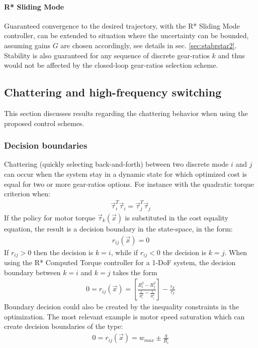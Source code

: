 \paragraph{R* Sliding Mode} Guaranteed convergence to the desired trajectory, with the R* Sliding Mode controller, can be extended to situation where the uncertainty can be bounded, assuming gains $G$ are chosen accordingly, see details in sec. \ref{sec:stabrstar2}. Stability is also guaranteed for any sequence of discrete gear-ratios $k$ and thus would not be affected by the closed-loop gear-ratios selection scheme.


\subsection{Chattering and high-frequency switching}

This section discusses results regarding the chattering behavior when using the proposed control schemes. 

\subsubsection{Decision boundaries}

Chattering (quickly selecting back-and-forth) between two discrete mode $i$ and $j$ can occur when the system stay in a dynamic state for which optimized cost is equal for two or more gear-ratios options. For instance with the quadratic torque criterion when:
%
\begin{align}
\vec{\tau}_i^T \vec{\tau}_i = \vec{\tau}_j^T \vec{\tau}_j
\end{align}
%
If the policy for motor torque $\vec{\tau}_k(\vec{x})$ is substituted in the cost equality equation, the result is a decision boundary in the state-space, in the form:
%
\begin{align}
r_{ij} ( \vec{x} ) = 0
\end{align}
%
If $r_{ij}>0$ then the decision is $k=i$, while if $r_{ij}<0$ the decision is $k=j$. When using the R* Computed Torque controller for a 1-DoF system, the decision boundary between $k=i$ and $k=j$ takes the form
%
\begin{align}
0 = r_{ij} ( \vec{x} )  = \left[ \frac{R_i^2-R_j^2}{\frac{1}{R_i^2}-\frac{1}{R_j^2}}\right] - \frac{\tau_E}{\tau_I}
\end{align}
%
Boundary decision could also be created by the inequality constraints in the optimization. The most relevant example is motor speed saturation which can create decision boundaries of the type:
%
\begin{align}
0 = r_{ij} ( \vec{x} )  = w_{max} \pm \frac{\dot{q}}{R_i}
\end{align}
%

